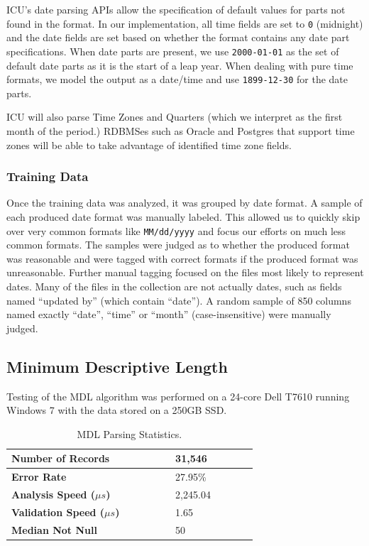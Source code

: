 ICU's date parsing APIs allow the specification of default values for parts not found in the format. In our implementation, all time fields are set to \texttt{0} (midnight) and the date fields are set based on whether the format contains any date part specifications. When date parts are present, we use \texttt{2000-01-01} as the set of default date parts as it is the start of a leap year. When dealing with pure time formats, we model the output as a date/time and use \texttt{1899-12-30} for the date parts.

ICU will also parse Time Zones and Quarters (which we interpret as the first month of the period.) RDBMSes such as Oracle and Postgres that support time zones will be able to take advantage of  identified time zone fields.

\subsubsection{Training Data}

Once the training data was analyzed, it was grouped by date format. A sample of each produced date format was manually labeled. This allowed us to quickly skip over very common formats like \texttt{MM/dd/yyyy} and focus our efforts on much less common formats. The samples were judged as to whether the produced format was reasonable and were tagged with correct formats if the produced format was unreasonable.
Further manual tagging focused on the files most likely to represent dates. Many of the files in the collection are not actually dates, such as fields named ``updated by'' (which contain ``date''). A random sample of 850 columns named exactly ``date'', ``time'' or ``month'' (case-insensitive) were manually judged.

\subsection{Minimum Descriptive Length}
Testing of the MDL algorithm was performed on a 24-core Dell T7610 running Windows 7 with the data stored on a 250GB SSD.

\begin{table}[ht]
\centering
\bgroup
\def\arraystretch{1.5}
\begin{tabular}{|p{0.48\linewidth}| p{0.24\linewidth}|}
\hline
\textbf{Number of Records} & 31,546\\ \hline
\textbf{Error Rate} & 27.95\% \\ \hline
\textbf{Analysis Speed ($\mu s$)} & 2,245.04 \\ \hline
\textbf{Validation Speed ($\mu s$)} & 1.65 \\ \hline
\textbf{Median Not Null} & 50 \\ \hline
\end{tabular}
\egroup
\caption{MDL Parsing Statistics.}
\label{tab:mdlstats}
\end{table}

